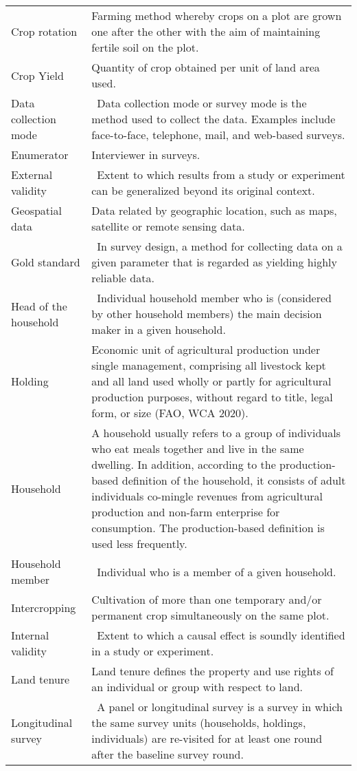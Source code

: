 \documentclass[
]{book}
\begin{document}
\begin{longtable}[]{@{}ll@{}}
Crop rotation & Farming method whereby crops on a plot are grown one after the other with the aim of maintaining fertile soil on the plot. \\
Crop Yield & Quantity of crop obtained per unit of land area used. \\
Data collection mode & ~Data collection mode or survey mode is the method used to collect the data. Examples include face-to-face, telephone, mail, and web-based surveys. \\
Enumerator & Interviewer in surveys. \\
External validity & ~Extent to which results from a study or experiment can be generalized beyond its original context. \\
Geospatial data & Data related by geographic location, such as maps, satellite or remote sensing data. \\
Gold standard & ~In survey design, a method for collecting data on a given parameter that is regarded as yielding highly reliable data. \\
Head of the household & ~Individual household member who is (considered by other household members) the main decision maker in a given household. \\
Holding & Economic unit of agricultural production under single management, comprising all livestock kept and all land used wholly or partly for agricultural production purposes, without regard to title, legal form, or size (FAO, WCA 2020). \\
Household & A household usually refers to a group of individuals who eat meals together and live in the same dwelling. In addition, according to the production-based definition of the household, it consists of adult individuals co-mingle revenues from agricultural production and non-farm enterprise for consumption. The production-based definition is used less frequently. \\
Household member & ~Individual who is a member of a given household. \\
Intercropping & Cultivation of more than one temporary and/or permanent crop simultaneously on the same plot. \\
Internal validity & ~Extent to which a causal effect is soundly identified in a study or experiment. \\
Land tenure & Land tenure defines the property and use rights of an individual or group with respect to land. \\
Longitudinal survey & ~A panel or longitudinal survey is a survey in which the same survey units (households, holdings, individuals) are re-visited for at least one round after the baseline survey round. \\

\end{longtable}
\end{document}
